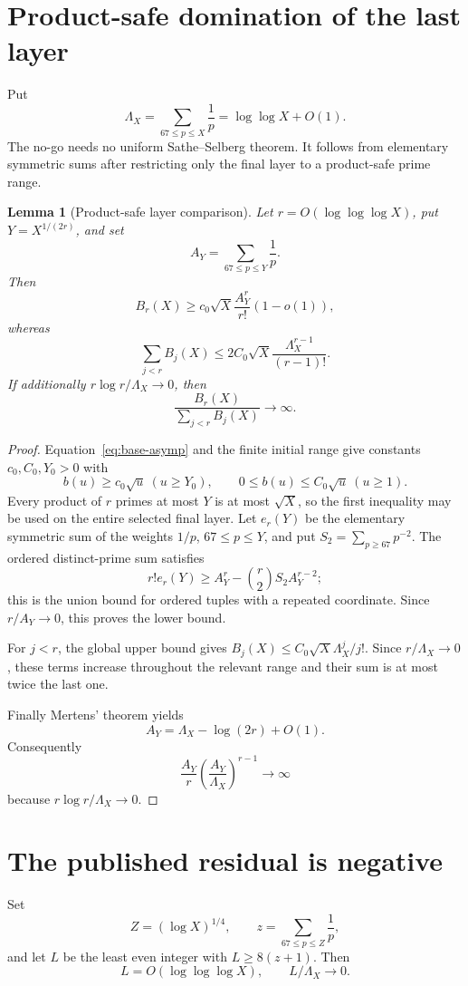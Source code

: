 \documentclass[11pt]{article}
\newtheorem{lemma}[theorem]{Lemma}
\newcommand{\1}{\mathbf 1}
\begin{document}
\section{Product-safe domination of the last layer}
Put
\[
 \Lambda_X=\sum_{67\le p\le X}\frac1p=\log\log X+O(1).
\]
The no-go needs no uniform Sathe--Selberg theorem.  It follows from elementary
symmetric sums after restricting only the final layer to a product-safe prime
range.

\begin{lemma}[Product-safe layer comparison]\label{lem:layers}
Let $r=O(\log\log\log X)$, put $Y=X^{1/(2r)}$, and set
\[
 A_Y=\sum_{67\le p\le Y}\frac1p.
\]
Then
\[
 B_r(X)\ge c_0\sqrt X\frac{A_Y^r}{r!}(1-o(1)),
\]
whereas
\[
 \sum_{j<r}B_j(X)
 \le 2C_0\sqrt X\frac{\Lambda_X^{r-1}}{(r-1)!}.
\]
If additionally $r\log r/\Lambda_X\to0$, then
\[
 \frac{B_r(X)}{\sum_{j<r}B_j(X)}\longrightarrow\infty.
\]
\end{lemma}
\begin{proof}
Equation~\eqref{eq:base-asymp} and the finite initial range give constants
$c_0,C_0,Y_0>0$ with
\[
 b(u)\ge c_0\sqrt u\ (u\ge Y_0),\qquad
 0\le b(u)\le C_0\sqrt u\ (u\ge1).
\]
Every product of $r$ primes at most $Y$ is at most $\sqrt X$, so the first
inequality may be used on the entire selected final layer.  Let $e_r(Y)$ be the
elementary symmetric sum of the weights $1/p$, $67\le p\le Y$, and put
$S_2=\sum_{p\ge67}p^{-2}$.  The ordered distinct-prime sum satisfies
\[
 r!e_r(Y)\ge A_Y^r-\binom r2S_2A_Y^{r-2};
\]
this is the union bound for ordered tuples with a repeated coordinate.  Since
$r/A_Y\to0$, this proves the lower bound.

For $j<r$, the global upper bound gives
$B_j(X)\le C_0\sqrt X\Lambda_X^j/j!$.  Since $r/\Lambda_X\to0$, these terms
increase throughout the relevant range and their sum is at most twice the last
one.

Finally Mertens' theorem yields
\[
 A_Y=\Lambda_X-\log(2r)+O(1).
\]
Consequently
\[
 \frac{A_Y}{r}\left(\frac{A_Y}{\Lambda_X}\right)^{r-1}\to\infty
\]
because $r\log r/\Lambda_X\to0$.
\end{proof}

\section{The published residual is negative}
Set
\[
 Z=(\log X)^{1/4},\qquad z=\sum_{67\le p\le Z}\frac1p,
\]
and let $L$ be the least even integer with $L\ge8(z+1)$.  Then
\[
 L=O(\log\log\log X),\qquad L/\Lambda_X\to0.
\]
\end{document}
